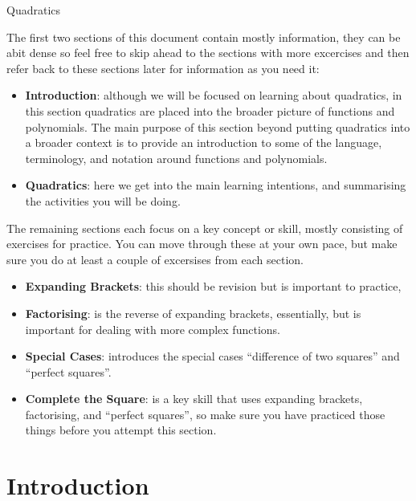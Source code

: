 \documentclass[12pt]{article}
\begin{document}



\begin{center}
{\Huge Quadratics}
\end{center}

The first two sections of this document contain mostly information, they can be abit dense so feel free to skip ahead to the sections with more excercises and then refer back to these sections later for information as you need it:
\begin{itemize}
  \item \textbf{Introduction}: although we will be focused on learning about quadratics, in this section quadratics are placed into the broader picture of functions and polynomials. The main purpose of this section beyond putting quadratics into a broader context is to provide an introduction to some of the language, terminology, and notation around functions and polynomials.
  \item \textbf{Quadratics}: here we get into the main learning intentions, and summarising the activities you will be doing.
\end{itemize}

The remaining sections each focus on a key concept or skill, mostly consisting of exercises for practice. You can move through these at your own pace, but make sure you do at least a couple of excersises from each section.
\begin{itemize}
  \item \textbf{Expanding Brackets}: this should be revision but is important to practice,
  \item \textbf{Factorising}: is the reverse of expanding brackets, essentially, but is important for dealing with more complex functions.
  \item \textbf{Special Cases}: introduces the special cases ``difference of two squares'' and ``perfect squares''.
  \item \textbf{Complete the Square}: is a key skill that uses expanding brackets, factorising, and ``perfect squares'', so make sure you have practiced those things before you attempt this section.
\end{itemize}


\section*{Introduction}
\end{document}
